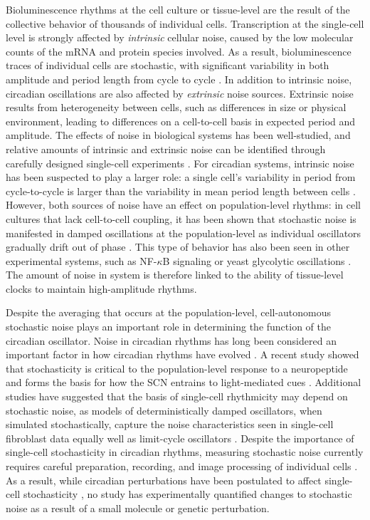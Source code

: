 \documentclass[11pt, letterpaper]{article}
\begin{document}
Bioluminescence rhythms at the cell culture or tissue-level are the result of the collective behavior of thousands of individual cells.
Transcription at the single-cell level is strongly affected by {\itshape intrinsic} cellular noise, caused by the low molecular counts of the mRNA and protein species involved. 
As a result, bioluminescence traces of individual cells are stochastic, with significant variability in both amplitude and period length from cycle to cycle \cite{Welsh2004}. 
In addition to intrinsic noise, circadian oscillations are also affected by {\itshape extrinsic} noise sources.
Extrinsic noise results from heterogeneity between cells, such as differences in size or physical environment, leading to differences on a cell-to-cell basis in expected period and amplitude.
The effects of noise in biological systems has been well-studied, and relative amounts of intrinsic and extrinsic noise can be identified through carefully designed single-cell experiments \cite{Elowitz2002}.
For circadian systems, intrinsic noise has been suspected to play a larger role: a single cell's variability in period from cycle-to-cycle is larger than the variability in mean period length between cells \cite{Herzog2004}.
However, both sources of noise have an effect on population-level rhythms: in cell cultures that lack cell-to-cell coupling, it has been shown that  stochastic noise is manifested in damped oscillations at the population-level as individual oscillators gradually drift out of phase \cite{Nagoshi2004, Welsh2004}.
This type of behavior has also been seen in other experimental systems, such as NF-$\kappa$B signaling or yeast glycolytic oscillations \cite{Nelson2004, Aon1992}.
The amount of noise in system is therefore linked to the ability of tissue-level clocks to maintain high-amplitude rhythms.

Despite the averaging that occurs at the population-level, cell-autonomous stochastic noise plays an important role in determining the function of the circadian oscillator.
Noise in circadian rhythms has long been considered an important factor in how circadian rhythms have evolved \cite{Barkai2000}.
A recent study showed that stochasticity is critical to the population-level response to a neuropeptide and forms the basis for how the SCN entrains to light-mediated cues \cite{An2013}.
Additional studies have suggested that the basis of single-cell rhythmicity may depend on stochastic noise, as models of deterministically damped oscillators, when simulated stochastically, capture the noise characteristics seen in single-cell fibroblast data equally well as limit-cycle oscillators \cite{Westermark2009}.
Despite the importance of single-cell stochasticity in circadian rhythms, measuring stochastic noise currently requires careful preparation, recording, and image processing of individual cells \cite{Leise2012}. 
As a result, while circadian perturbations have been postulated to affect single-cell stochasticity \cite{Rougemont2007}, no study has experimentally quantified changes to stochastic noise as a result of a small molecule or genetic perturbation.
\end{document}
